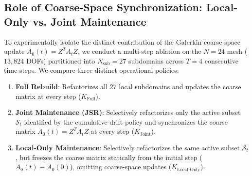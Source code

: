 \documentclass[preprint,12pt,3p]{elsarticle}
\begin{document}
\subsection{Role of Coarse-Space Synchronization: Local-Only vs. Joint Maintenance}
\label{subsec:res_coarse_ablation}

To experimentally isolate the distinct contribution of the Galerkin coarse space update $A_0(t) = Z^T A_t Z$, we conduct a multi-step ablation on the $N=24$ mesh ($13,824$ DOFs) partitioned into $N_{\text{sub}} = 27$ subdomains across $T=4$ consecutive time steps. We compare three distinct operational policies:
\begin{enumerate}
    \item \textbf{Full Rebuild}: Refactorizes all 27 local subdomains and updates the coarse matrix at every step ($K_{\text{Full}}$).
    \item \textbf{Joint Maintenance (JSR)}: Selectively refactorizes only the active subset $\mathcal{S}_t$ identified by the cumulative-drift policy and synchronizes the coarse matrix $A_0(t) = Z^T A_t Z$ at every step ($K_{\text{Joint}}$).
    \item \textbf{Local-Only Maintenance}: Selectively refactorizes the same active subset $\mathcal{S}_t$, but freezes the coarse matrix statically from the initial step ($A_0(t) \equiv A_0(0)$), omitting coarse-space updates ($K_{\text{Local-Only}}$).
\end{enumerate}

\begin{table}[htbp]
\centering
\small
\caption{Multi-step comparison between Full Rebuild, Joint JSR, and Local-Only maintenance ($N=24$, 27 subdomains, 4 time steps).}
\label{tab:coarse_ablation}
\end{table}
\end{document}

